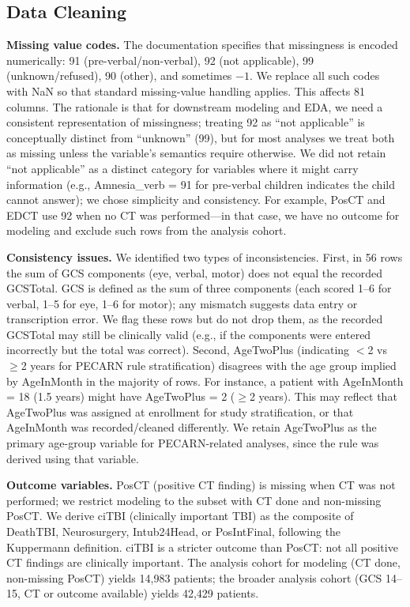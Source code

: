 \documentclass[12ptpt,letterpaper]{article}
\begin{document}
\subsection{Data Cleaning}\label{data-cleaning}

\textbf{Missing value codes.} The documentation specifies that missingness is encoded numerically: 91 (pre-verbal/non-verbal), 92 (not applicable), 99 (unknown/refused), 90 (other), and sometimes $-1$. We replace all such codes with NaN so that standard missing-value handling applies. This affects 81 columns. The rationale is that for downstream modeling and EDA, we need a consistent representation of missingness; treating 92 as ``not applicable'' is conceptually distinct from ``unknown'' (99), but for most analyses we treat both as missing unless the variable's semantics require otherwise. We did not retain ``not applicable'' as a distinct category for variables where it might carry information (e.g., Amnesia\_verb = 91 for pre-verbal children indicates the child cannot answer); we chose simplicity and consistency. For example, PosCT and EDCT use 92 when no CT was performed---in that case, we have no outcome for modeling and exclude such rows from the analysis cohort.

\textbf{Consistency issues.} We identified two types of inconsistencies. First, in 56 rows the sum of GCS components (eye, verbal, motor) does not equal the recorded GCSTotal. GCS is defined as the sum of three components (each scored 1--6 for verbal, 1--5 for eye, 1--6 for motor); any mismatch suggests data entry or transcription error. We flag these rows but do not drop them, as the recorded GCSTotal may still be clinically valid (e.g., if the components were entered incorrectly but the total was correct). Second, AgeTwoPlus (indicating $<$2 vs $\ge$2 years for PECARN rule stratification) disagrees with the age group implied by AgeInMonth in the majority of rows. For instance, a patient with AgeInMonth = 18 (1.5 years) might have AgeTwoPlus = 2 ($\ge$2 years). This may reflect that AgeTwoPlus was assigned at enrollment for study stratification, or that AgeInMonth was recorded/cleaned differently. We retain AgeTwoPlus as the primary age-group variable for PECARN-related analyses, since the rule was derived using that variable.

\textbf{Outcome variables.} PosCT (positive CT finding) is missing when CT was not performed; we restrict modeling to the subset with CT done and non-missing PosCT. We derive ciTBI (clinically important TBI) as the composite of DeathTBI, Neurosurgery, Intub24Head, or PosIntFinal, following the Kuppermann definition. ciTBI is a stricter outcome than PosCT: not all positive CT findings are clinically important. The analysis cohort for modeling (CT done, non-missing PosCT) yields 14,983 patients; the broader analysis cohort (GCS 14--15, CT or outcome available) yields 42,429 patients.
\end{document}
